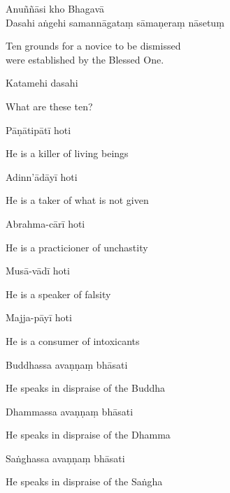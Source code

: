 Anuññāsi kho Bhagavā\\
Dasahi aṅgehi samannāgataṃ sāmaṇeraṃ nāsetuṃ

\begin{cprenglish}
  Ten grounds for a novice to be dismissed\\
  were established by the Blessed One.
\end{cprenglish}

Katamehi dasahi

\begin{cprenglish}
  What are these ten?
\end{cprenglish}

Pāṇātipātī hoti

\begin{cprenglish}
  He is a killer of living beings
\end{cprenglish}

Adinn'ādāyī hoti

\begin{cprenglish}
  He is a taker of what is not given
\end{cprenglish}

Abrahma-cārī hoti

\begin{cprenglish}
  He is a practicioner of unchastity
\end{cprenglish}

Musā-vādī hoti

\begin{cprenglish}
  He is a speaker of falsity
\end{cprenglish}

Majja-pāyī hoti

\begin{cprenglish}
  He is a consumer of intoxicants
\end{cprenglish}

Buddhassa avaṇṇaṃ bhāsati

\begin{cprenglish}
  He speaks in dispraise of the Buddha
\end{cprenglish}

Dhammassa avaṇṇaṃ bhāsati

\begin{cprenglish}
  He speaks in dispraise of the Dhamma
\end{cprenglish}

Saṅghassa avaṇṇaṃ bhāsati

\begin{cprenglish}
  He speaks in dispraise of the Saṅgha
\end{cprenglish}

